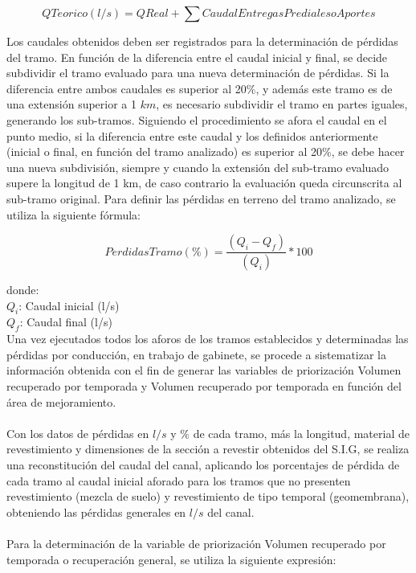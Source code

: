 \documentclass[]{article}
\begin{document}
\begin{equation}
Q Teorico (l/s) = Q Real + \sum{Caudal Entregas Prediales o Aportes}
\end{equation}

Los caudales obtenidos deben ser registrados para la determinación de pérdidas del tramo. En función de la diferencia entre el caudal inicial y final, se decide subdividir el tramo evaluado para una nueva determinación de pérdidas.  Si la diferencia entre ambos caudales es superior al 20$\%$, y además este tramo es de una extensión superior a 1 $km$, es necesario subdividir el tramo en partes iguales, generando los sub-tramos. Siguiendo el procedimiento se afora el caudal en el punto medio, si la diferencia entre este caudal y los definidos anteriormente (inicial o final, en función del tramo analizado) es superior al 20$\%$, se debe hacer una nueva subdivisión, siempre y cuando la extensión del sub-tramo evaluado supere la longitud de 1 km, de caso contrario la evaluación queda circunscrita al sub-tramo original. Para definir las pérdidas en terreno del tramo analizado, se utiliza la siguiente fórmula:

\begin{equation}
Perdidas Tramo (\%)=\frac{(Q_i - Q_f)}{(Q_i)}*100
\end{equation}

donde:\\
$Q_i$: Caudal inicial (l/s)\\
$Q_f$: Caudal final (l/s)\\

Una vez ejecutados todos los aforos de los tramos establecidos y determinadas las pérdidas por conducción, en trabajo de gabinete, se procede a sistematizar la información obtenida con el fin de generar las variables de priorización Volumen recuperado por temporada y Volumen recuperado por temporada en función del área de mejoramiento. \\
\\
Con los datos de pérdidas en $l/s$ y $\%$ de cada tramo, más la longitud, material de revestimiento y dimensiones de la sección a revestir obtenidos del S.I.G, se realiza una reconstitución del caudal del canal, aplicando los porcentajes de pérdida de cada tramo al caudal inicial aforado para los tramos que no presenten revestimiento (mezcla de suelo) y revestimiento de tipo temporal (geomembrana), obteniendo las pérdidas generales en $l/s$ del canal.\\
\\
Para la determinación de la variable de priorización Volumen recuperado por temporada o recuperación general, se utiliza la siguiente expresión:
\end{document}
